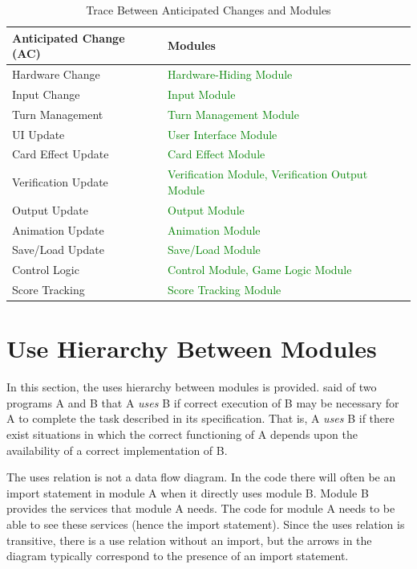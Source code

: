 \documentclass[12pt, titlepage]{article}
\newcommand{\added}[1]{\textcolor{green}{#1}}
\begin{document}
\begin{table}[H]
\centering
\begin{tabular}{p{} p{}}
\toprule
\textbf{Anticipated Change (AC)} & \textbf{Modules}\\
\midrule
Hardware Change & \added{Hardware-Hiding Module}\\
Input Change & \added{Input Module}\\
Turn Management & \added{Turn Management Module}\\
UI Update & \added{User Interface Module}\\
Card Effect Update & \added{Card Effect Module}\\
Verification Update & \added{Verification Module, Verification Output Module}\\
Output Update & \added{Output Module}\\
Animation Update & \added{Animation Module}\\
Save/Load Update & \added{Save/Load Module}\\
Control Logic & \added{Control Module, Game Logic Module}\\
Score Tracking & \added{Score Tracking Module}\\
\bottomrule
\end{tabular}
\caption{Trace Between Anticipated Changes and Modules}
\label{TblACT}
\end{table}

\section{Use Hierarchy Between Modules} \label{SecUse}

In this section, the uses hierarchy between modules is provided. \citet{Parnas1978} said of two programs A and B that A {\em uses} B if
correct execution of B may be necessary for A to complete the task described in
its specification. That is, A {\em uses} B if there exist situations in which
the correct functioning of A depends upon the availability of a correct
implementation of B.

The uses relation is not a data flow diagram. In the code there will often
be an import statement in module A when it directly uses module B. Module B
provides the services that module A needs. The code for module A needs to be
able to see these services (hence the import statement). Since the uses
relation is transitive, there is a use relation without an import, but the
arrows in the diagram typically correspond to the presence of an import statement.
\end{document}
